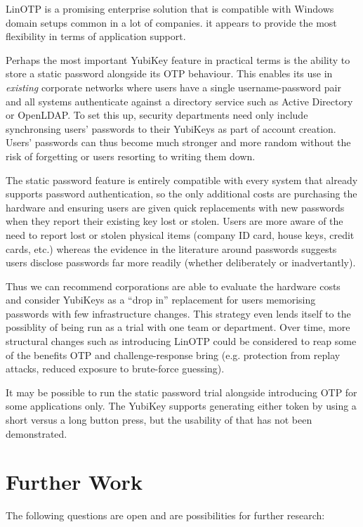 \documentclass{report}
\begin{document}
LinOTP is a promising enterprise solution that is compatible with Windows
domain setups common in a lot of companies. it appears to provide the most
flexibility in terms of application support.

Perhaps the most important YubiKey feature in practical terms is the ability
to store a static password alongside its OTP behaviour. This enables its
use in \emph{existing} corporate networks where users have a single username-password
pair and all systems authenticate against a directory service such as Active Directory
or OpenLDAP. To set this up, security departments need only include synchronsing
users' passwords to their YubiKeys as part of account creation. Users' passwords
can thus become much stronger and more random without the risk of forgetting or
users resorting to writing them down.

The static password feature is entirely compatible with every system that already
supports password authentication, so the only additional costs are purchasing
the hardware and ensuring users are given quick replacements with new passwords
when they report their existing key lost or stolen. Users are more aware of the
need to report lost or stolen physical items (company ID card, house keys, credit cards, etc.)
whereas the evidence in the literature around passwords suggests users disclose
passwords far more readily (whether deliberately or inadvertantly).

Thus we can recommend corporations are able to evaluate the hardware costs
and consider YubiKeys as a ``drop in'' replacement for users memorising
passwords with few infrastructure changes. This strategy even lends itself
to the possiblity of being run as a trial with one team or department. Over time,
more structural changes such as introducing LinOTP could be considered to
reap some of the benefits OTP and challenge-response bring (e.g. protection
from replay attacks, reduced exposure to brute-force guessing).

It may be possible to run the static password trial alongside introducing OTP
for some applications only. The YubiKey supports generating either token
by using a short versus a long button press, but the usability of that has
not been demonstrated.

\chapter{Further Work}

The following questions are open and are possibilities for further research:
\end{document}
